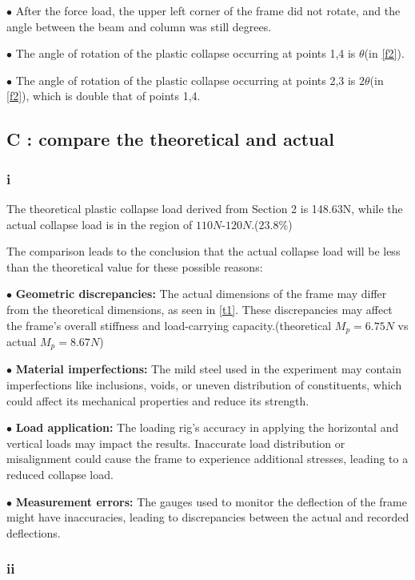 $\bullet$ After the force load, the upper left corner of the frame did not rotate, and the angle between the beam and column was still degrees.

$\bullet$ The angle of rotation of the plastic collapse occurring at points 1,4 is $\theta$(in \autoref{f2}).

$\bullet$ The angle of rotation of the plastic collapse occurring at points 2,3 is $2\theta$(in \autoref{f2}), which is double that of points 1,4.

\subsection*{C : compare the theoretical and actual}
\subsubsection*{i}

The theoretical plastic collapse load derived from Section 2 is 148.63N, while the actual collapse load is in the region of $110N$-$120N$.($23.8\%$)

The comparison leads to the conclusion that the actual collapse load will be less than the theoretical value for these possible reasons:

$\bullet$ \textbf{Geometric discrepancies:} The actual dimensions of the frame may differ from the theoretical dimensions, as seen in \autoref{t1}. These discrepancies may affect the frame's overall stiffness and load-carrying capacity.(theoretical $M_p=6.75N$ vs actual $M_p=8.67N$)

$\bullet$ \textbf{Material imperfections:} The mild steel used in the experiment may contain imperfections like inclusions, voids, or uneven distribution of constituents, which could affect its mechanical properties and reduce its strength.

$\bullet$ \textbf{Load application:} The loading rig's accuracy in applying the horizontal and vertical loads may impact the results. Inaccurate load distribution or misalignment could cause the frame to experience additional stresses, leading to a reduced collapse load.

$\bullet$ \textbf{Measurement errors:} The gauges used to monitor the deflection of the frame might have inaccuracies, leading to discrepancies between the actual and recorded deflections.

\subsubsection*{ii}

